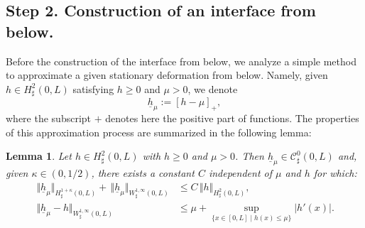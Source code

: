 \documentclass[11pt]{article}
\let\mathcal\mathscr
\newtheorem{lemma}[theorem]{Lemma}
\theoremstyle{remark}
\theoremstyle{definition}
\newcommand{\norme}[1]{\,\Vert #1\Vert}
\newcommand{\hb}{{\underline{h}}}
\begin{document}
\subsection{Step 2. Construction of an interface from below.}
Before the construction of the interface from below, we analyze a simple method to approximate a given stationary deformation from below. Namely, given $h \in H^2_{\sharp}(0,L)$ satisfying $h \geq 0$ and $\mu >0$, we denote
\[
\hb_{\mu} := [h-\mu]_{+},
\]
where the subscript $+$ denotes here the positive part of functions. The properties of this approximation process
are summarized in the following lemma:
\begin{lemma}\label{lemma.halpha}
Let $h \in H^{2}_{\sharp}(0,L)$ with $h \geq 0$ and $\mu >0$.
Then $\hb_{\mu}\in \mathcal{C}_\sharp^{0}(0,L)$ and, given $\kappa \in (0,1/2)$, there exists a constant $C$
independent of $\mu$ and $h$ for which:
\begin{align}
\norme{\hb_{\mu}}_{H_\sharp^{1+\kappa}(0,L)} + \norme{\hb_{\mu}}_{W^{1,\infty}_\sharp(0,L)}&\leq C\norme{h}_{H_\sharp^{2}(0,L)}, \label{h1}\\
\norme{\hb_{\mu}-h}_{W_\sharp^{1, \infty}(0,L)}&\leq {\mu}+\sup_{\{x\in[0, L]\mid h(x)\leq \mu\}}\vert h'(x)\vert.\label{h2}
\end{align}
\end{lemma}
\end{document}
